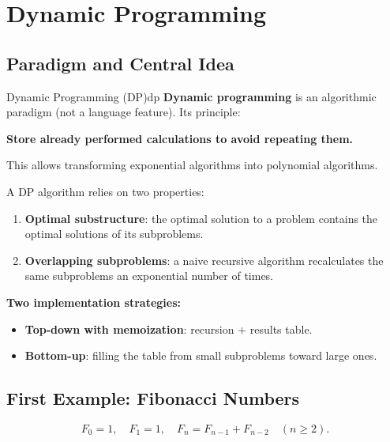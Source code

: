\section*{Dynamic Programming}

\subsection{Paradigm and Central Idea}

\begin{definition}{Dynamic Programming (DP)}{dp}
\textbf{Dynamic programming} is an algorithmic paradigm (not a language feature). 
Its principle:
\begin{center}
  \textbf{Store already performed calculations to avoid repeating them.}
\end{center}
This allows transforming exponential algorithms into polynomial algorithms.
\end{definition}

A DP algorithm relies on two properties:
\begin{enumerate}
  \item \textbf{Optimal substructure}: the optimal solution to a problem contains the 
        optimal solutions of its subproblems.
  \item \textbf{Overlapping subproblems}: a naive recursive algorithm recalculates 
        the same subproblems an exponential number of times.
\end{enumerate}

\textbf{Two implementation strategies:}
\begin{itemize}
  \item \textbf{Top-down with memoization}: recursion + results table.
  \item \textbf{Bottom-up}: filling the table from small subproblems toward large ones.
\end{itemize}

\subsection{First Example: Fibonacci Numbers}

\[
  F_0 = 1,\quad F_1 = 1,\quad F_n = F_{n-1} + F_{n-2} \quad (n \ge 2).
\]

